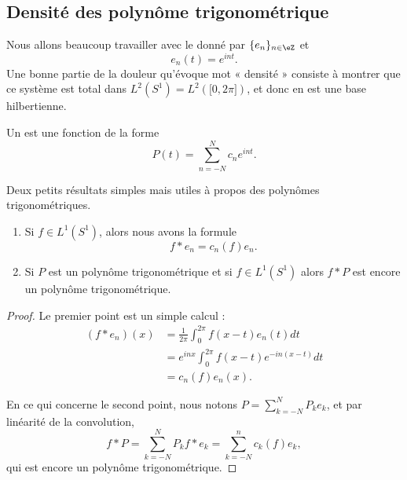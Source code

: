 \subsection{Densité des polynôme trigonométrique}

Nous allons beaucoup travailler avec le  donné par \( \{ e_n \}_{n\in \eZ}\) et
\begin{equation}
    e_n(t)= e^{int}.
\end{equation}
Une bonne partie de la douleur qu'évoque mot « densité » consiste à montrer que ce système est total dans \( L^2(S^1)=L^2(\mathopen[ 0 , 2\pi \mathclose])\), et donc en est une base hilbertienne. 

\begin{definition}
    Un  est une fonction de la forme
    \begin{equation}
        P(t)=\sum_{n=-N}^Nc_n e^{int}.
    \end{equation}
\end{definition}

\begin{lemma}   \label{LemZVfZlms}
    Deux petits résultats simples mais utiles à propos des polynômes trigonométriques.
    \begin{enumerate}
        \item
    Si \( f\in L^1(S^1)\), alors nous avons la formule
    \begin{equation}
        f*e_n=c_n(f)e_n.
    \end{equation}
\item

    Si \( P\) est un polynôme trigonométrique et si \( f\in L^1(S^1)\) alors \( f*P\) est encore un polynôme trigonométrique.
    \end{enumerate}
\end{lemma}

\begin{proof}
    Le premier point est un simple calcul :
    \begin{subequations}
        \begin{align}
            (f*e_n)(x)&=\frac{1}{ 2\pi }\int_0^{2\pi}f(x-t)e_n(t)dt\\
            &= e^{inx}\int_0^{2\pi}f(x-t) e^{-in(x-t)}dt\\
            &=c_n(f)e_n(x).
        \end{align}
    \end{subequations}

    En ce qui concerne le second point, nous notons \( P=\sum_{k=-N}^NP_ke_k\), et par linéarité de la convolution,
    \begin{equation}
        f*P=\sum_{k=-N}^NP_kf*e_k=\sum_{k=-N}^nc_k(f)e_k,
    \end{equation}
    qui est encore un polynôme trigonométrique.
\end{proof}


